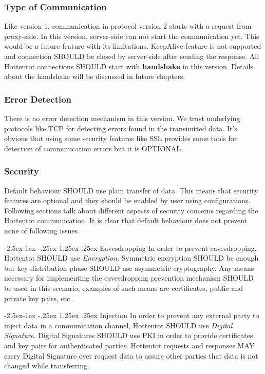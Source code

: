 \documentclass[10pt,a4paper]{article}
\makeatletter
\renewcommand\paragraph{\@startsection{paragraph}{4}{\z@}%
            {-2.5ex\@plus -1ex \@minus -.25ex}%
            {1.25ex \@plus .25ex}%
            {\normalfont\normalsize\bfseries}}
\makeatother
\begin{document}
\subsubsection{Type of Communication}
Like version 1, communication in protocol version 2 starts with a request from proxy-side. In this version, server-side can not start the communication yet. This would be a future feature with its limitations. KeepAlive feature is not supported and connection SHOULD be closed by server-side after sending the response. All Hottentot connections SHOULD start with \textbf{handshake} in this version. Details about the handshake will be discussed in future chapters.

\subsubsection{Error Detection}
There is no error detection mechanism in this version. We trust underlying protocols like TCP for detecting errors found in the transimtted data. It's obvious that using some security features like SSL provides some tools for detection of communication errors but it is OPTIONAL.

\subsubsection{Security}
Default behaviour SHOULD use plain transfer of data. This means that security features are optional and they should be enabled by user using configurations. Following sections talk about different aspects of security concerns regarding the Hottentot communication. It is clear that default behaviour does not prevent none of following issues.

\paragraph{Eavesdropping}
In order to prevent eavesdropping, Hottentot SHOULD use \textit{Encryption}. Symmetric encryption SHOULD be enough but key distribution phase SHOULD use asymmetric cryptography. Any means necessary for implementing the eavesdropping prevention mechanism SHOULD be used in this scenario; examples of such means are certificates, public and private key pairs, etc.

\paragraph{Injection}
In order to prevent any external party to inject data in a communication channel, Hottentot SHOULD use \textit{Digital Signature}. Digital Signatures SHOULD use PKI in order to provide certificates and key pairs for authenticated parties. Hottentot requests and responses MAY carry Digital Signature over request data to assure other parties that data is not changed while transferring.
\end{document}
